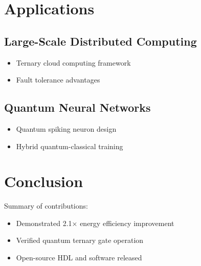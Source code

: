 \documentclass[12pt]{article}
\begin{document}
\section{Applications}
\subsection{Large-Scale Distributed Computing}
\begin{itemize}
\item Ternary cloud computing framework
\item Fault tolerance advantages
\end{itemize}

\subsection{Quantum Neural Networks}
\begin{itemize}
\item Quantum spiking neuron design
\item Hybrid quantum-classical training
\end{itemize}

\section{Conclusion}
Summary of contributions:
\begin{itemize}
\item Demonstrated 2.1× energy efficiency improvement
\item Verified quantum ternary gate operation
\item Open-source HDL and software released
\end{itemize}



\end{document}

